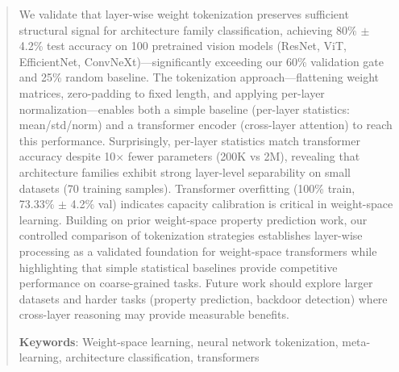 \begin{abstract}
We validate that layer-wise weight tokenization preserves sufficient structural signal for architecture family classification, achieving 80\% $\pm$ 4.2\% test accuracy on 100 pretrained vision models (ResNet, ViT, EfficientNet, ConvNeXt)---significantly exceeding our 60\% validation gate and 25\% random baseline. The tokenization approach---flattening weight matrices, zero-padding to fixed length, and applying per-layer normalization---enables both a simple baseline (per-layer statistics: mean/std/norm) and a transformer encoder (cross-layer attention) to reach this performance. Surprisingly, per-layer statistics match transformer accuracy despite 10$\times$ fewer parameters (200K vs 2M), revealing that architecture families exhibit strong layer-level separability on small datasets (70 training samples). Transformer overfitting (100\% train, 73.33\% $\pm$ 4.2\% val) indicates capacity calibration is critical in weight-space learning. Building on prior weight-space property prediction work, our controlled comparison of tokenization strategies establishes layer-wise processing as a validated foundation for weight-space transformers while highlighting that simple statistical baselines provide competitive performance on coarse-grained tasks. Future work should explore larger datasets and harder tasks (property prediction, backdoor detection) where cross-layer reasoning may provide measurable benefits.

\textbf{Keywords}: Weight-space learning, neural network tokenization, meta-learning, architecture classification, transformers
\end{abstract}
